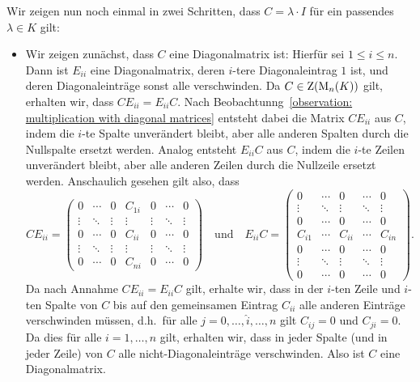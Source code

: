 Wir zeigen nun noch einmal in zwei Schritten, dass $C = \lambda \cdot I$ für ein passendes $\lambda \in K$ gilt:
\begin{itemize}
  \item
    Wir zeigen zunächst, dass $C$ eine Diagonalmatrix ist:
    Hierfür sei $1 \leq i \leq n$.
    Dann ist $E_{ii}$ eine Diagonalmatrix, deren $i$-tere Diagonaleintrag $1$ ist, und deren Diagonaleinträge sonst alle verschwinden.
    Da $C \in \operatorname{Z}(\operatorname{M}_{n}(K))$ gilt, erhalten wir, dass $C E_{ii} = E_{ii} C$.
    Nach Beobachtunng~\ref{observation: multiplication with diagonal matrices} entsteht dabei die Matrix $C E_{ii}$ aus $C$, indem die $i$-te Spalte unverändert bleibt, aber alle anderen Spalten durch die Nullspalte ersetzt werden.
    Analog entsteht $E_{ii} C$ aus $C$, indem die $i$-te Zeilen unverändert bleibt, aber alle anderen Zeilen durch die Nullzeile ersetzt werden.
    Anschaulich gesehen gilt also, dass
    \[
      C E_{ii}
      =
      \begin{pmatrix}
        0       & \cdots  & 0       & C_{1i}    & 0       & \cdots  & 0       \\
        \vdots  & \ddots  & \vdots  & \vdots    & \vdots  & \ddots  & \vdots  \\
        0       & \cdots  & 0       & C_{ii}    & 0       & \cdots  & 0       \\
        \vdots  & \ddots  & \vdots  & \vdots    & \vdots  & \ddots  & \vdots  \\
        0       & \cdots  & 0       & C_{ni}    & 0       & \cdots  & 0
      \end{pmatrix}
      \quad\text{und}\quad
      E_{ii} C
      = \begin{pmatrix}
        0       & \cdots  & 0       & \cdots  & 0       \\
        \vdots  & \ddots  & \vdots  & \ddots  & \vdots  \\
        0       & \cdots  & 0       & \cdots  & 0       \\
        C_{i1}  & \cdots  & C_{ii}  & \cdots  & C_{in}  \\
        0       & \cdots  & 0       & \cdots  & 0       \\
        \vdots  & \ddots  & \vdots  & \ddots  & \vdots  \\
        0       & \cdots  & 0       & \cdots  & 0
      \end{pmatrix}.
    \]
    Da nach Annahme $C E_{ii} = E_{ii} C$ gilt, erhalte wir, dass in der $i$-ten Zeile und $i$-ten Spalte von $C$ bis auf den gemeinsamen Eintrag $C_{ii}$ alle anderen Einträge verschwinden müssen, d.h.\ für alle $j = 0, \dotsc, \hat{i}, \dotsc, n$ gilt $C_{ij} = 0$ und $C_{ji} = 0$.
    Da dies für alle $i = 1, \dotsc, n$ gilt, erhalten wir, dass in jeder Spalte (und in jeder Zeile) von $C$ alle nicht-Diagonaleinträge verschwinden.
    Also ist $C$ eine Diagonalmatrix.
    

\end{itemize}
